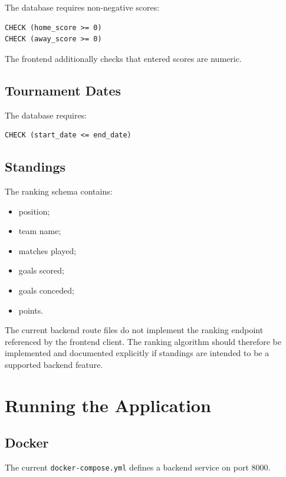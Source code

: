 \documentclass[11pt,a4paper]{article}
\begin{document}
The database requires non-negative scores:

\begin{lstlisting}
CHECK (home_score >= 0)
CHECK (away_score >= 0)
\end{lstlisting}

The frontend additionally checks that entered scores are numeric.

\subsection{Tournament Dates}

The database requires:

\begin{lstlisting}
CHECK (start_date <= end_date)
\end{lstlisting}

\subsection{Standings}

The ranking schema contains:

\begin{itemize}
    \item position;
    \item team name;
    \item matches played;
    \item goals scored;
    \item goals conceded;
    \item points.
\end{itemize}

The current backend route files do not implement the ranking endpoint
referenced by the frontend client. The ranking algorithm should
therefore be implemented and documented explicitly if standings are
intended to be a supported backend feature.

\section{Running the Application}

\subsection{Docker}

The current \texttt{docker-compose.yml} defines a backend service
on port 8000.
\end{document}
